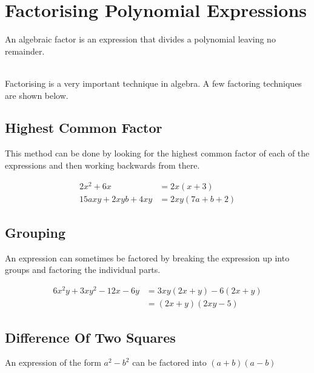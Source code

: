 \documentclass[english,course]{lecture}
\begin{document}
\section{Factorising Polynomial Expressions}\label{factoring}


\begin{definition}[Factor]
	An algebraic factor is an expression that divides a polynomial leaving no remainder.
\end{definition}
\\

Factorising is a very important technique in algebra.
A few factoring techniques are shown below.

\subsection{Highest Common Factor}

This method can be done by looking for the highest common factor of each of the expressions and then working backwards from there.

\begin{example}[Factor]
	\begin{align*}
		2x^2 + 6x          & = 2x(x + 3)       \\
		15axy + 2xyb + 4xy & = 2xy(7a + b + 2)
	\end{align*}
\end{example}

\subsection{Grouping}

An expression can sometimes be factored by breaking the expression up into groups and factoring the individual parts.

\begin{example}[Factor]
	\begin{align*}
		6x^2y + 3xy^2 -12x - 6y & = 3xy(2x + y) - 6(2x + y) \\
		                        & = (2x + y)(2xy - 5)
	\end{align*}
\end{example}

\subsection{Difference Of Two Squares}

\begin{theorem}
	An expression of the form $a^2 - b^2$ can be factored into $(a + b)(a - b)$
\end{theorem}
\end{document}

